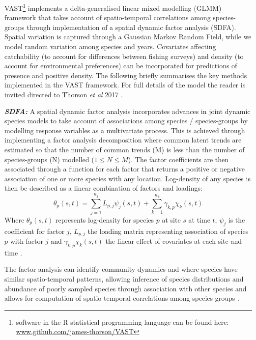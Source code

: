 \documentclass{nature}
\begin{document}
\begin{linenumbers}
VAST\footnote{software in the R statistical programming language can be found
	here: \url{www.github.com/james-thorson/VAST}} implements a
delta-generalised linear mixed modelling (GLMM) framework that takes account of
spatio-temporal correlations among species-groups through implementation of a
spatial dynamic factor analysis (SDFA). Spatial variation is captured through a
Gaussian Markov Random Field, while we model random variation among species and
years. Covariates affecting catchability (to account for differences between
fishing surveys) and density (to account for environmental preferences) can be
incorporated for predictions of presence and positive density. The following
briefly summarises the key methods implemented in the VAST framework. For full
details of the model the reader is invited directed to Thorson \textit{et al}
2017 \cite{Thorson2017}.

\textbf{\textit{SDFA:}} A spatial dynamic factor analysis incorporates
advances in joint dynamic species models \cite{Thorson2017} to take account
of associations among species / species-groups by modelling response variables
as a multivariate process. This is achieved through implementing a factor
analysis decomposition where common latent trends are estimated so that the
number of common trends (M) is less than the number of species-groups (N)
modelled ($1 \leq N \leq M$). The factor coefficients are then associated
through a function for each factor that returns a positive or negative
association of one or more species with any location. Log-density of any
species is then be described as a linear combination of factors and loadings:
	\begin{equation}
		\theta_{p}(s,t) = \sum_{j=1}^{n_{j}}
		L_{p,j}\psi_{j}(s,t) +\sum_{k=1}^{n_{k}}
		\gamma_{k,p}\chi_{k}(s,t)
	\end{equation}
Where $\theta_{p}(s,t)$ represents log-density for species $p$ at site $s$ at
time $t$, $\psi_{j}$ is the coefficient for factor $j$, $L_{p,j}$ the loading
matrix representing association of species $p$ with factor $j$ and
$\gamma_{k,p}\chi_{k}(s,t)$ the linear effect of covariates at each site and
time \cite{Thorson2016b}. 

The factor analysis can identify community dynamics and where species have
similar spatio-temporal patterns, allowing inference of species distributions
and abundance of poorly sampled species through association with other species
and allows for computation of spatio-temporal correlations among species-groups
\cite{Thorson2016b}.


\end{linenumbers}
\end{document}
